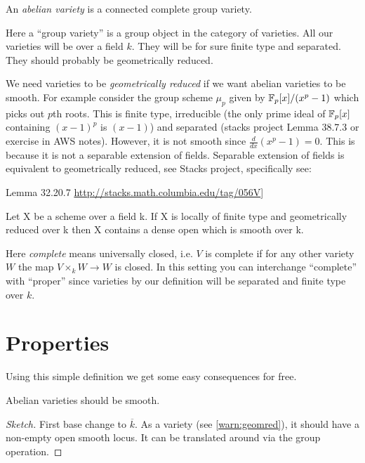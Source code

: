 \documentclass[11pt]{article}
\begin{document}
\begin{defn}\label{def:av}
	An \emph{abelian variety} is a connected complete group variety.
\end{defn}

Here a ``group variety'' is a group object in the category of varieties. All our varieties will be over a field $k$. They will be for sure finite type and separated. They should probably be geometrically reduced.

\begin{warn}\label{warn:geomred}
	We need varieties to be \emph{geometrically reduced} if we want abelian varieties to be smooth. For example consider the group scheme $\mu_p$ given by $\mathbb{F}_p[x]/(x^p - 1)$ which picks out $p$th roots. This is finite type, irreducible (the only prime ideal of $\mathbb{F}_p[x]$ containing $(x-1)^p$ is $(x-1)$) and separated (stacks project Lemma 38.7.3 or exercise in AWS notes). However, it is not smooth since $\frac{d}{dx}(x^p - 1) = 0$. This is because it is not a separable extension of fields. Separable extension of fields is equivalent to geometrically reduced, see Stacks project, specifically see:
	
	Lemma 32.20.7 \url{http://stacks.math.columbia.edu/tag/056V}]
	
	Let X be a scheme over a field k. If X is locally of finite type and geometrically reduced over k then X contains a dense open which is smooth over k.
\end{warn}

\begin{rem}
	Here \emph{complete} means universally closed, i.e. $V$ is complete if for any other variety $W$ the map $V\times_k W \to W$ is closed. In this setting you can interchange ``complete'' with ``proper'' since varieties by our definition will be separated and finite type over $k$.
\end{rem}

\section{Properties}

Using this simple definition we get some easy consequences for free.

\begin{prop}
	Abelian varieties should be smooth.
\end{prop}
\begin{proof}[Sketch]
	First base change to $\overline{k}$. As a variety (see \autoref{warn:geomred}), it should have a non-empty open smooth locus. It can be translated around via the group operation.
\end{proof}
\end{document}
